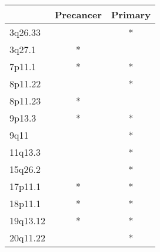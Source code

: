 \begin{tabular}{lcc}
\toprule
{} & Precancer & Primary \\
\midrule
3q26.33  &           &       * \\
3q27.1   &         * &         \\
7p11.1   &         * &       * \\
8p11.22  &           &       * \\
8p11.23  &         * &         \\
9p13.3   &         * &       * \\
9q11     &           &       * \\
11q13.3  &           &       * \\
15q26.2  &           &       * \\
17p11.1  &         * &       * \\
18p11.1  &         * &       * \\
19q13.12 &         * &       * \\
20q11.22 &           &       * \\
\bottomrule
\end{tabular}
